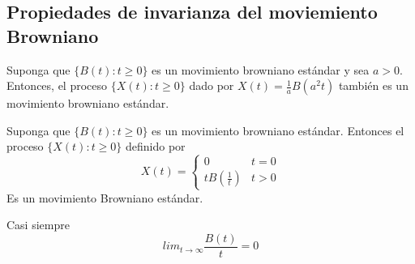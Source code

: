     
    \subsection{Propiedades de invarianza del moviemiento Browniano}
    
    \begin{lemma}
        Suponga que \( \{ B(t):t\geq0\} \) es un movimiento browniano estándar y sea $a>0$. Entonces, el proceso \( \{X(t):t\geq0\} \) dado por \(X(t)= \frac{1}{a}B(a^2t) \) también es un movimiento browniano estándar. 
    \end{lemma}
    \begin{lemma}
        Suponga que \(\{ B(t):t\geq0 \}\) es un movimiento browniano estándar. Entonces el proceso \( \{X(t): t\geq 0\}\) definido por 
        \[
            X(t) = \left\{
                            \begin{array}{lr}
                                0 & t=0 \\
                                tB\left(\frac{1}{t}\right) & t>0
                            \end{array}\right.
        \]
        Es un movimiento Browniano estándar.  
    \end{lemma}
    
    \begin{corollary}
        Casi siempre 
        \[
            lim_{t\to \infty}\frac{B(t)}{t}=0
        \]
    \end{corollary}

